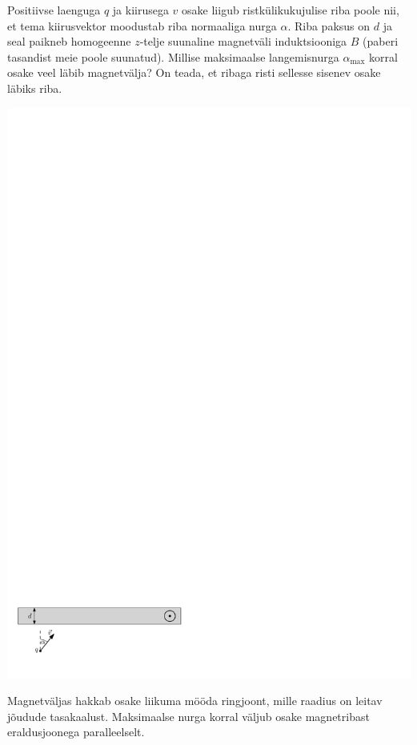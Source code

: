 
Positiivse laenguga $q$ ja kiirusega $v$ osake liigub ristkülikukujulise riba poole nii, et tema kiirusvektor
moodustab riba normaaliga nurga $\alpha$. Riba paksus on $d$ ja seal paikneb
homogeenne $z$-telje suunaline
magnetväli induktsiooniga $B$ (paberi tasandist meie poole suunatud). Millise maksimaalse
langemisnurga $\alpha_{\mathrm{max}}$ korral
osake veel läbib magnetvälja? On teada, et ribaga risti sellesse sisenev osake
läbiks riba.

\begin{center}
\includegraphics[width=\linewidth]{2013-lahg-02-magnetpeegeljoonis_ipe}
\end{center}

\hint
Magnetväljas hakkab osake liikuma mööda ringjoont, mille raadius on leitav jõudude tasakaalust. Maksimaalse nurga korral väljub osake magnetribast eraldusjoonega paralleelselt.

